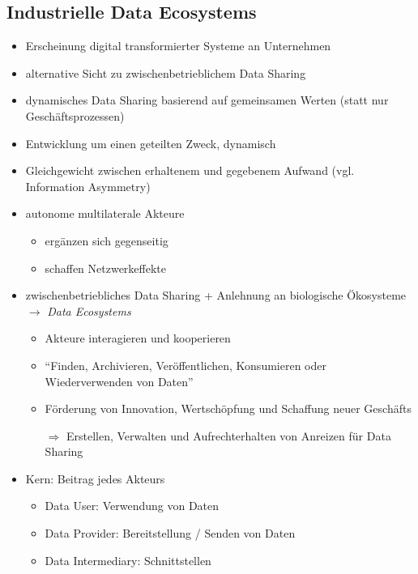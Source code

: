 \subsection{Industrielle Data Ecosystems}

\begin{itemize}
    \item Erscheinung digital transformierter Systeme an Unternehmen
    \item alternative Sicht zu zwischenbetrieblichem Data Sharing
    \item dynamisches Data Sharing basierend auf gemeinsamen Werten (statt nur Geschäftsprozessen)
    \item Entwicklung um einen geteilten Zweck, dynamisch
    \item Gleichgewicht zwischen erhaltenem und gegebenem Aufwand (vgl. Information Asymmetry)
    \item autonome multilaterale Akteure
    \begin{itemize}
        \item ergänzen sich gegenseitig
        \item schaffen Netzwerkeffekte
    \end{itemize}
    \item zwischenbetriebliches Data Sharing + Anlehnung an biologische Ökosysteme $\to$ \emph{Data Ecosystems}
    \begin{itemize}
        \item Akteure interagieren und kooperieren
        \item \enquote{Finden, Archivieren, Veröffentlichen, Konsumieren oder Wiederverwenden von Daten}
        \item Förderung von Innovation, Wertschöpfung und Schaffung neuer Geschäfts
        \item[$\Rightarrow$] Erstellen, Verwalten und Aufrechterhalten von Anreizen für Data Sharing
    \end{itemize}
    \item Kern: Beitrag jedes Akteurs
    \begin{itemize}
        \item Data User: Verwendung von Daten
        \item Data Provider: Bereitstellung / Senden von Daten
        \item Data Intermediary: Schnittstellen~\cite{mollerIndustrialDataEcosystems2024}
    \end{itemize}
\end{itemize}



